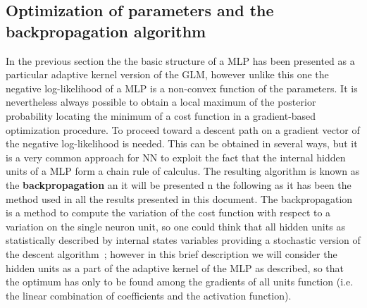 



\subsection{Optimization of parameters and the backpropagation algorithm}

In the previous section the the basic structure of a \acl{MLP} has been presented as a particular adaptive kernel version of the \acl{GLM}, however unlike this one the negative log-likelihood of a \acl{MLP} is a non-convex function of the parameters. It is nevertheless always possible to obtain a local maximum of the posterior probability locating the minimum of a cost function in a gradient-based optimization procedure. 
To proceed toward a descent path on a gradient vector of the negative log-likelihood is needed. This can be obtained in several ways, but it is a very common approach for NN to exploit the fact that the internal hidden units of a \acl{MLP} form a chain rule of calculus. The resulting algorithm is known as the \textbf{backpropagation} an it will be presented n the following as it has been the method used in all the results presented in this document. The backpropagation is a method to compute the variation of the cost function with respect to a variation on the single neuron unit, so one could think that all hidden units as statistically described by internal states variables providing a stochastic version of the descent algorithm~\cite{rezende2014stochastic}; however in this brief description we will consider the hidden units as a part of the adaptive kernel of the \acl{MLP} as described, so that the optimum has only to be found among the gradients of all units function (i.e. the linear combination of coefficients and the activation function). 

